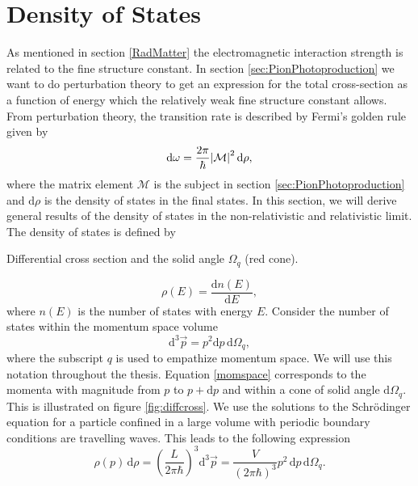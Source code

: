\section{Density of States}
As mentioned in section \ref{RadMatter} the electromagnetic interaction strength is related to the fine structure constant. In section \ref{sec:PionPhotoproduction} we want to do perturbation theory to get an expression for the total cross-section as a function of energy which the relatively weak fine structure constant allows. From perturbation theory, the transition rate is described by Fermi's golden rule given by
\begin{equation} \label{FermiGolden}
	\text{d}\omega = \frac{2\pi}{\hbar}\abs{\mathcal{M}}^2 \text{d}\rho,
\end{equation}
where the matrix element $\mathcal{M}$ is the subject in section \ref{sec:PionPhotoproduction} and $\text{d}\rho$ is the density of states in the final states. In this section, we will derive general results of the density of states in the non-relativistic and relativistic limit. The density of states is defined by
\begin{marginfigure}
	\centering
	
	\caption{Differential cross section and the solid angle $\Omega_q$ (red cone).}
	\label{fig:diffcross}
\end{marginfigure}
\begin{equation} \label{DensityOfStates}
	\rho(E) = \frac{\text{d}n(E)}{\text{d}E},
\end{equation}
where $n(E)$ is the number of states with energy $E$. Consider the number of states within the momentum space volume
\begin{equation} \label{momspace}
	\text{d}^3\vec{p} = p^2 \text{d}p \, \text{d}\Omega_q,
\end{equation}
where the subscript $q$ is used to empathize momentum space. We will use this notation throughout the thesis. Equation \eqref{momspace} corresponds to the momenta with magnitude from $p$ to $p+\text{d}p$ and within a cone of solid angle $\text{d}\Omega_q$. This is illustrated on figure \ref{fig:diffcross}. We use the solutions to the Schrödinger equation for a particle confined in a large volume with periodic boundary conditions are travelling waves. This leads to the following expression
\begin{equation} \label{densityrho}
	\rho(p) \, \text{d}\rho = \left( \frac{L}{2\pi\hbar}\right)^3 \text{d}^3 \vec{p} = \frac{V}{(2\pi\hbar)^3} p^2 \, \text{d}p \, \text{d}\Omega_q.
\end{equation}
